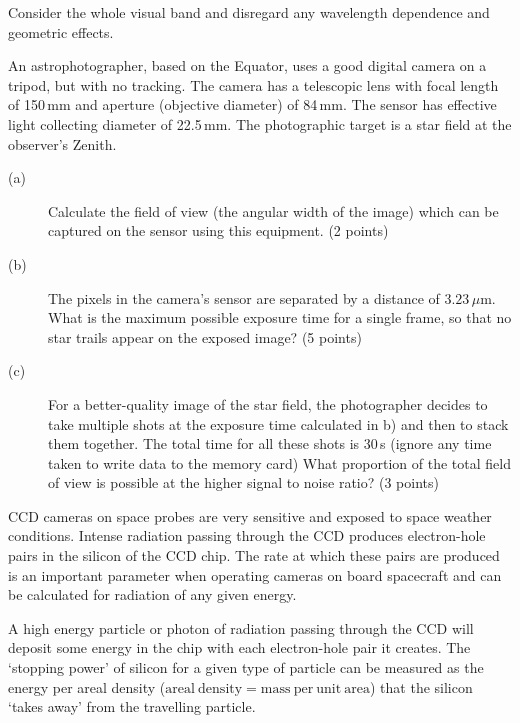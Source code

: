 Consider the whole visual band and disregard any wavelength dependence and
geometric effects.

An astrophotographer, based on the Equator, uses a good digital camera on a
tripod, but with no tracking. The camera has a telescopic lens with focal
length of 150\,mm and aperture (objective diameter) of 84\,mm. The sensor has
effective light collecting diameter of 22.5\,mm. The photographic target is a
star field at the observer's Zenith.

\begin{description}
\item[(a)] Calculate the field of view (the angular width of the image) which
  can be captured on the sensor using this equipment. \hfill(2 points)
\item[(b)] The pixels in the camera's sensor are separated by a distance of
  $3.23\,\mu$m. What is the maximum possible exposure time for a single
  frame, so that no star trails appear on the exposed image?
  \hfill(5 points)
\item[(c)] For a better-quality image of the star field, the photographer
  decides to take multiple shots at the exposure time calculated in b) and
  then to stack them together. The total time for all these shots is 30\,s
  (ignore any time taken to write data to the memory card) What proportion of
  the total field of view is possible at the higher signal to noise ratio?
  \hfill(3 points)
\end{description}

CCD cameras on space probes are very sensitive and exposed to space weather
conditions. Intense radiation passing through the CCD produces electron-hole
pairs in the silicon of the CCD chip. The rate at which these pairs are
produced is an important parameter when operating cameras on board spacecraft
and can be calculated for radiation of any given energy.

A high energy particle or photon of radiation passing through the CCD will
deposit some energy in the chip with each electron-hole pair it creates. The
`stopping power' of silicon for a given type of particle can be measured as
the energy per areal density ($\mathrm{areal\ density} = \mathrm{mass\ per\
unit\ area}$) that the silicon `takes away' from the travelling particle.

